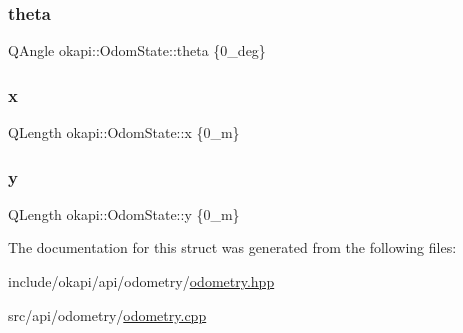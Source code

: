 \subsubsection{\texorpdfstring{theta}{theta}}
{\footnotesize\ttfamily Q\+Angle okapi\+::\+Odom\+State\+::theta \{0\+\_\+deg\}}

\mbox{\label{structokapi_1_1OdomState_a53fbbb483d5073e703517745d769eb45}} 
\subsubsection{\texorpdfstring{x}{x}}
{\footnotesize\ttfamily Q\+Length okapi\+::\+Odom\+State\+::x \{0\+\_\+m\}}

\mbox{\label{structokapi_1_1OdomState_afcb08739959ad3afb7941a0bd59bcbb6}} 
\subsubsection{\texorpdfstring{y}{y}}
{\footnotesize\ttfamily Q\+Length okapi\+::\+Odom\+State\+::y \{0\+\_\+m\}}



The documentation for this struct was generated from the following files\+:\begin{DoxyCompactItemize}
\item 
include/okapi/api/odometry/\mbox{\hyperlink{odometry_8hpp}{odometry.\+hpp}}\item 
src/api/odometry/\mbox{\hyperlink{odometry_8cpp}{odometry.\+cpp}}\end{DoxyCompactItemize}
